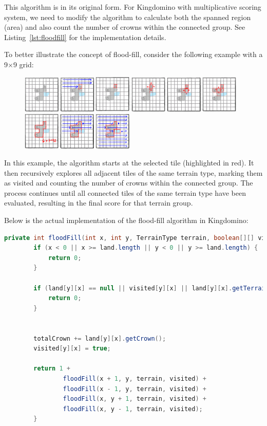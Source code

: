 \documentclass[conference]{IEEEtran}
\begin{document}
This algorithm is in its original form. For Kingdomino with multiplicative
scoring system, we need to modify the algorithm to calculate both the spanned
region (area) and also count the number of crowns within the connected group.
See Listing~\ref{lst:floodfill} for the implementation details.

To better illustrate the concept of flood-fill, consider the following example
with a 9$\times$9 grid:

\begin{figure}[htbp]
    \centerline{\includegraphics[width=0.48\textwidth]{assets/floodfill-start.png}}
    \centerline{\includegraphics[width=0.48\textwidth]{assets/floodfill-detected.png}}
    \centerline{\includegraphics[width=0.48\textwidth]{assets/floodfill-continue.png}}
\end{figure}

In this example, the algorithm starts at the selected tile (highlighted in
red). It then recursively explores all adjacent tiles of the same terrain type,
marking them as visited and counting the number of crowns within the connected
group. The process continues until all connected tiles of the same terrain type
have been evaluated, resulting in the final score for that terrain group.

Below is the actual implementation of the flood-fill algorithm in Kingdomino:

\begin{lstlisting}[language=Java, caption={Flood-Fill Algorithm}, label={lst:floodfill}]
    private int floodFill(int x, int y, TerrainType terrain, boolean[][] visited) {
        if (x < 0 || x >= land.length || y < 0 || y >= land.length) {
            return 0;
        }
    
        if (land[y][x] == null || visited[y][x] || land[y][x].getTerrain() != terrain) {
            return 0;
        }
        
    
        totalCrown += land[y][x].getCrown();
        visited[y][x] = true;
    
        return 1 +
                floodFill(x + 1, y, terrain, visited) +
                floodFill(x - 1, y, terrain, visited) +
                floodFill(x, y + 1, terrain, visited) +
                floodFill(x, y - 1, terrain, visited);
        }
    \end{lstlisting}
\end{document}
